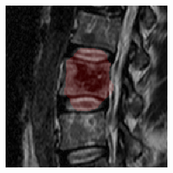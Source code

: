 \documentclass{article}
\begin{document}
{    \begin{figure}[h]
      \centering
      \begin{subfigure}[t]{0.45\linewidth}
        \centering
        \includegraphics[scale=1.4]{VertebraSegmentationExample_1.png}
        

\end{subfigure}
\end{figure}}
\end{document}
